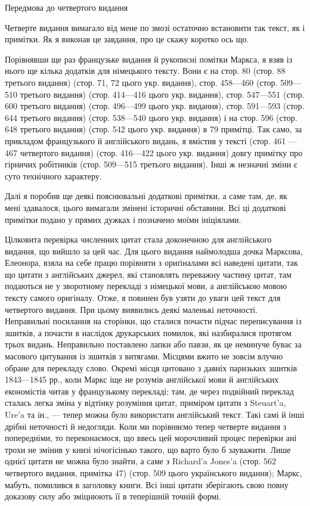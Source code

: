 Передмова до четвертого видання

Четверте видання вимагало від мене по змозі остаточно встановити
так текст, як і примітки. Як я виконав це завдання, про
це скажу коротко ось що.

Порівнявши ще раз французьке видання й рукописні помітки
Маркса, я взяв із нього ще кілька додатків для німецького тексту.
Вони є на стор. 80 (стор. 88 третього видання) (стор. 71, 72 цього
укр. видання), стор. 458—460 (стор. 509—510 третього видання)
(стор. 414—416 цього укр. видання), стор. 547—551 (стор. 600
третього видання) (стор. 496—499 цього укр. видання), стор.
591—593 (стор. 644 третього видання) (стор. 538—540 цього укр.
видання) і на стор. 596 (стор. 648 третього видання) (стор. 542
цього укр. видання) в 79 примітці. Так само, за прикладом французького
й англійського видань, я вмістив у тексті (стор. 461 —
467 четвертого видання) (стор. 416—422 цього укр. видання)
довгу примітку про гірничих робітників (стор. 509—515 третього
видання). Інші ж незначні зміни є суто технічного характеру.

Далі я поробив ще деякі пояснювальні додаткові примітки,
а саме там, де, як мені здавалося, цього вимагали змінені історичні
обставини. Всі ці додаткові примітки подано у прямих дужках
і позначено моїми ініціялами.

Цілковита перевірка численних цитат стала доконечною для
англійського видання, що вийшло за цей час. Для цього видання
наймолодша дочка Марксова, Елеонора, взяла на себе працю
порівняти з ориґіналами всі наведені цитати, так що цитати
з англійських джерел, які становлять переважну частину цитат,
там подаються не у зворотному перекладі з німецької мови, а
англійською мовою тексту самого оригіналу. Отже, я повинен був
узяти до уваги цей текст для четвертого видання. При цьому виявились
деякі маленькі неточності. Неправильні посилання на сторінки,
що сталися почасти підчас переписування із зшитків, а почасти
в наслідок друкарських помилок, які назбиралися протягом
трьох видань. Неправильно поставлено лапки або павзи, як це
неминуче буває за масового цитування із зшитків з витягами.
Місцями вжито не зовсім влучно обране для перекладу слово.
Окремі місця цитовано з давніх паризьких зшитків 1843—1845 рр.,
коли Маркс іще не розумів англійської мови й англійських економістів
читав у французькому перекладі; там, де через подвійний
переклад сталась легка зміна у відтінку розуміння цитат, приміром
цитати з Steuart’a, Ure’a та ін., — тепер можна було використати
англійський текст. Такі самі й інші дрібні неточності й недогляди.
Коли ми порівняємо тепер четверте видання з попередніми, то
переконаємося, що ввесь цей морочливий процес перевірки ані
трохи не змінив у книзі нічогісінько такого, що варто було б
зауважити. Лише однієї цитати не можна було знайти, а саме
з Richard’a Jones’a (стор. 562 четвертого видання, примітка 47)
(стор. 509 цього українського видання); Маркс, мабуть, помилився
в заголовку книги. Всі інші цитати зберігають свою повну
доказову силу або зміцнюють її в теперішній точній формі.


